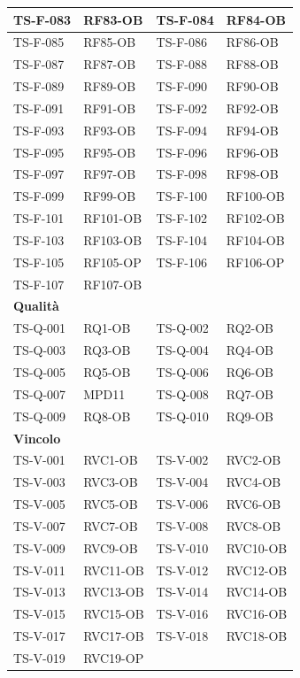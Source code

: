 \documentclass[a4paper,12pt]{article}
\begin{document}
{\begin{longtable}{|p{2.5cm}|p{2.2cm}|p{2.5cm}|p{2.2cm}|}
    \hline
    TS-F-083 & RF83-OB & TS-F-084 & RF84-OB \\
    \hline
    TS-F-085 & RF85-OB & TS-F-086 & RF86-OB \\
    \hline
    TS-F-087 & RF87-OB & TS-F-088 & RF88-OB \\
    \hline
    TS-F-089 & RF89-OB & TS-F-090 & RF90-OB \\
    \hline
    TS-F-091 & RF91-OB & TS-F-092 & RF92-OB \\
    \hline
    TS-F-093 & RF93-OB & TS-F-094 & RF94-OB \\
    \hline
    TS-F-095 & RF95-OB & TS-F-096 & RF96-OB \\
    \hline
    TS-F-097 & RF97-OB & TS-F-098 & RF98-OB \\
    \hline
    TS-F-099 & RF99-OB & TS-F-100 & RF100-OB \\
    \hline
    TS-F-101 & RF101-OB & TS-F-102 & RF102-OB \\
    \hline
    TS-F-103 & RF103-OB & TS-F-104 & RF104-OB \\
    \hline
    TS-F-105 & RF105-OP & TS-F-106 & RF106-OP \\
    \hline
    TS-F-107 & RF107-OB & & \\
    \hline
    \multicolumn{4}{|l|}{\cellcolor{gray!12}\textbf{Qualità}} \\
    \hline
    TS-Q-001 & RQ1-OB & TS-Q-002 & RQ2-OB \\
    \hline
    TS-Q-003 & RQ3-OB & TS-Q-004 & RQ4-OB \\
    \hline
    TS-Q-005 & RQ5-OB & TS-Q-006 & RQ6-OB \\
    \hline
    TS-Q-007 & MPD11  & TS-Q-008 & RQ7-OB \\
    \hline
    TS-Q-009 & RQ8-OB  & TS-Q-010 & RQ9-OB \\
    \hline
    \multicolumn{4}{|l|}{\cellcolor{gray!12}\textbf{Vincolo}} \\
    \hline
    TS-V-001 & RVC1-OB & TS-V-002 & RVC2-OB \\
    \hline
    TS-V-003 & RVC3-OB & TS-V-004 & RVC4-OB \\
    \hline
    TS-V-005 & RVC5-OB & TS-V-006 & RVC6-OB \\
    \hline
    TS-V-007 & RVC7-OB & TS-V-008 & RVC8-OB \\
    \hline
    TS-V-009 & RVC9-OB & TS-V-010 & RVC10-OB \\
    \hline
    TS-V-011 & RVC11-OB & TS-V-012 & RVC12-OB \\
    \hline
    TS-V-013 & RVC13-OB & TS-V-014 & RVC14-OB \\
    \hline
    TS-V-015 & RVC15-OB & TS-V-016 & RVC16-OB \\
    \hline
    TS-V-017 & RVC17-OB & TS-V-018 & RVC18-OB \\
    \hline
    TS-V-019 & RVC19-OP & & \\
    \hline
\end{longtable}
}
\end{document}

